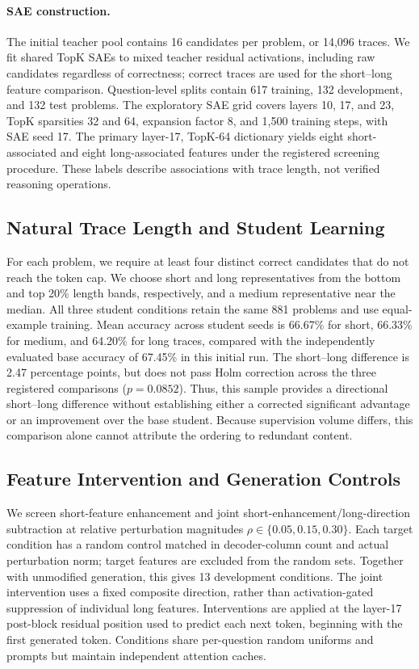 \paragraph{SAE construction.}
The initial teacher pool contains 16 candidates per problem, or 14,096 traces.
We fit shared TopK SAEs to mixed teacher residual activations, including raw candidates regardless of correctness; correct traces are used for the short--long feature comparison.
Question-level splits contain 617 training, 132 development, and 132 test problems.
The exploratory SAE grid covers layers 10, 17, and 23, TopK sparsities 32 and 64, expansion factor 8, and 1,500 training steps, with SAE seed 17.
The primary layer-17, TopK-64 dictionary yields eight short-associated and eight long-associated features under the registered screening procedure.
These labels describe associations with trace length, not verified reasoning operations.

\subsection{Natural Trace Length and Student Learning}
\label{sec:natural_length}

For each problem, we require at least four distinct correct candidates that do not reach the token cap.
We choose short and long representatives from the bottom and top 20\% length bands, respectively, and a medium representative near the median.
All three student conditions retain the same 881 problems and use equal-example training.
Mean accuracy across student seeds is 66.67\% for short, 66.33\% for medium, and 64.20\% for long traces, compared with the independently evaluated base accuracy of 67.45\% in this initial run.
The short--long difference is 2.47 percentage points, but does not pass Holm correction across the three registered comparisons ($p=0.0852$).
Thus, this sample provides a directional short--long difference without establishing either a corrected significant advantage or an improvement over the base student.
Because supervision volume differs, this comparison alone cannot attribute the ordering to redundant content.

\subsection{Feature Intervention and Generation Controls}
\label{sec:teacher_intervention}

We screen short-feature enhancement and joint short-enhancement/long-direction subtraction at relative perturbation magnitudes $\rho\in\{0.05,0.15,0.30\}$.
Each target condition has a random control matched in decoder-column count and actual perturbation norm; target features are excluded from the random sets.
Together with unmodified generation, this gives 13 development conditions.
The joint intervention uses a fixed composite direction, rather than activation-gated suppression of individual long features.
Interventions are applied at the layer-17 post-block residual position used to predict each next token, beginning with the first generated token.
Conditions share per-question random uniforms and prompts but maintain independent attention caches.

